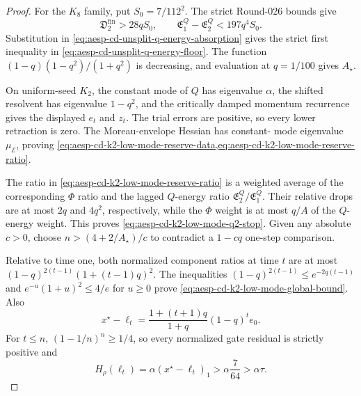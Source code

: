 \begin{proof}
For the $K_8$ family, put $S_0=7/112^2$.  The strict Round-026 bounds give
\begin{equation*}
 \mathfrak D_2^{\mathrm{fin}}>28qS_0,
 \qquad
 \mathfrak E_1^Q-\mathfrak E_2^Q<197q^4S_0.
\end{equation*}
Substitution in \cref{eq:aesp-cd-unsplit-q-energy-absorption} gives the
strict first inequality in \cref{eq:aesp-cd-unsplit-q-energy-floor}.  The
function $(1-q)(1-q^2)/(1+q^2)$ is decreasing, and evaluation at $q=1/100$
gives $A_\star$.

On uniform-seed $K_2$, the constant mode of $Q$ has eigenvalue $\alpha$, the
shifted resolvent has eigenvalue $1-q^2$, and the critically damped momentum
recurrence gives the displayed $e_t$ and $z_t$.  The trial errors are positive,
so every lower retraction is zero.  The Moreau-envelope Hessian has constant-
mode eigenvalue $\mu_{\mathcal E}$, proving
\cref{eq:aesp-cd-k2-low-mode-reserve-data,eq:aesp-cd-k2-low-mode-reserve-ratio}.

The ratio in \cref{eq:aesp-cd-k2-low-mode-reserve-ratio} is a weighted
average of the corresponding $\Phi$ ratio and the lagged $Q$-energy ratio
$\mathfrak E_2^Q/\mathfrak E_1^Q$.  Their relative drops are at most $2q$
and $4q^2$, respectively, while the $\Phi$ weight is at most
$q/A$ of the $Q$-energy weight.  This proves
\cref{eq:aesp-cd-k2-low-mode-q2-stop}.  Given any absolute $c>0$, choose
$n>(4+2/A_\star)/c$ to contradict a $1-cq$ one-step comparison.

Relative to time one, both normalized component ratios at time $t$ are at
most $(1-q)^{2(t-1)}(1+(t-1)q)^2$.  The inequalities
$(1-q)^{2(t-1)}\leq e^{-2q(t-1)}$ and
$e^{-u}(1+u)^2\leq4/e$ for $u\geq0$ prove
\cref{eq:aesp-cd-k2-low-mode-global-bound}.  Also
\begin{equation*}
 x^\star-\ell_t
 =\frac{1+(t+1)q}{1+q}(1-q)^te_0.
\end{equation*}
For $t\leq n$, $(1-1/n)^n\geq1/4$, so every normalized gate residual is
strictly positive and
\begin{equation*}
 H_\rho(\ell_t)
 =\alpha(x^\star-\ell_t)_1
 >\alpha\frac7{64}>\alpha\tau.
\end{equation*}


\end{proof}
